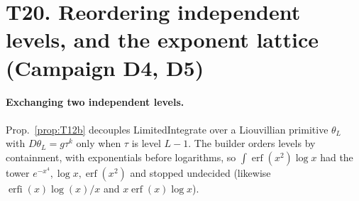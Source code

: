 \documentclass[11pt]{article}
\theoremstyle{definition}
\theoremstyle{remark}
\begin{document}
\section*{T20. Reordering independent levels, and the exponent lattice (Campaign D4, D5)}
\label{sec:T20}

\paragraph{Exchanging two independent levels.} Prop.~\ref{prop:T12b} decouples
LimitedIntegrate over a Liouvillian primitive $\theta_L$ with $D\theta_L=g\tau^k$ only when
$\tau$ is level $L-1$. The builder orders levels by containment, with exponentials before
logarithms, so $\int\operatorname{erf}(x^2)\log x$ had the tower $e^{-x^4},\log x,\operatorname{erf}(x^2)$
and stopped undecided (likewise $\operatorname{erfi}(x)\log(x)/x$ and $x\operatorname{erf}(x)\log x$).
\end{document}
